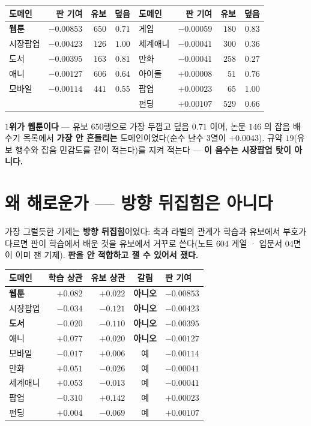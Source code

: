\documentclass[10pt,a4paper]{article}
\begin{document}
\begin{center}
\begin{tabular}{lrrr|lrrr}
\toprule
도메인 & 판 기여 & 유보 & 덮음 & 도메인 & 판 기여 & 유보 & 덮음 \\
\midrule
\textbf{웹툰} & $\mathbf{-0.00853}$ & $650$ & $0.71$ & 게임 & $-0.00059$ & $180$ & $0.83$ \\
시장팝업 & $-0.00423$ & $126$ & $1.00$ & 세계애니 & $-0.00041$ & $300$ & $0.36$ \\
도서 & $-0.00395$ & $163$ & $0.81$ & 만화 & $-0.00041$ & $258$ & $0.27$ \\
애니 & $-0.00127$ & $606$ & $0.64$ & 아이돌 & $+0.00008$ & $51$ & $0.76$ \\
모바일 & $-0.00114$ & $441$ & $0.55$ & 팝업 & $+0.00023$ & $65$ & $1.00$ \\
& & & & 펀딩 & $+0.00107$ & $529$ & $0.66$ \\
\bottomrule
\end{tabular}
\end{center}

\textbf{$1$위가 웹툰이다} --- 유보 $650$행으로 가장 두껍고 덮음 $0.71$ 이며, 논문 $146$
의 잡음 배수기 목록에서 \textbf{가장 안 흔들리는} 도메인이었다(순수 난수 $3$열이
$+0.0043$). 규약 $19$(유보 행수와 잡음 민감도를 같이 적는다)를 지켜 적는다 ---
\textbf{이 음수는 시장팝업 탓이 아니다.}

\section{왜 해로운가 --- 방향 뒤집힘은 아니다}

가장 그럴듯한 기제는 \textbf{방향 뒤집힘}이었다: 축과 라벨의 관계가 학습과 유보에서
부호가 다르면 판이 학습에서 배운 것을 유보에서 거꾸로 쓴다(노트 $604$ 계열 · 입문서
$04$면이 이미 잰 기제). \textbf{판을 안 적합하고 잴 수 있어서 쟀다.}

\begin{center}
\begin{tabular}{lrrcl}
\toprule
도메인 & 학습 상관 & 유보 상관 & 갈림 & 판 기여 \\
\midrule
\textbf{웹툰} & $+0.082$ & $+0.022$ & \textbf{아니오} & $-0.00853$ \\
시장팝업 & $-0.034$ & $-0.121$ & \textbf{아니오} & $-0.00423$ \\
\textbf{도서} & $-0.020$ & $-0.110$ & \textbf{아니오} & $-0.00395$ \\
애니 & $+0.077$ & $+0.020$ & \textbf{아니오} & $-0.00127$ \\
모바일 & $-0.017$ & $+0.006$ & 예 & $-0.00114$ \\
만화 & $+0.051$ & $-0.026$ & 예 & $-0.00041$ \\
세계애니 & $+0.053$ & $-0.013$ & 예 & $-0.00041$ \\
팝업 & $-0.310$ & $+0.142$ & 예 & $+0.00023$ \\
펀딩 & $+0.004$ & $-0.069$ & 예 & $+0.00107$ \\
\bottomrule
\end{tabular}
\end{center}
\end{document}
